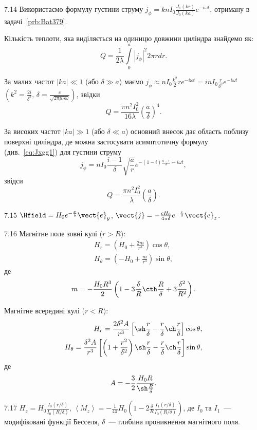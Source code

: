 \begin{Solution}{7.{14}}
	Використаємо формулу густини струму $j_{\phi} = knI_0\frac{J_1(kr)}{J_0(ka)}e^{-i\omega t}$, отриману в задачі~\ref{prb:Bat379}.

	Кількість теплоти, яка виділяється на одиницю довжини циліндра знайдемо як:
	\[
		Q = \frac{1}{2\lambda}\int\limits_0^a |j_{\phi}|^2 2\pi rdr.
	\]

	За малих частот $|ka| \ll 1$ (або $\delta \gg a$) маємо $j_{\phi} \approx nI_0\frac{k^2}{2}re^{-i\omega t} = inI_0\frac{r}{\delta^2}e^{-i\omega t}$ $\left( k^2 = \frac{2i}{\delta^2},\,  \delta = \frac{c}{\sqrt{2\pi\mu\lambda\omega}}\right) $, звідки
	\[
		Q = \frac{\pi n^2 I_0^2}{16\lambda}\left( \frac{a}{\delta}\right)^4.
	\]

	За високих частот $|ka| \gg 1$ (або $\delta \ll a$) основний внесок дає область поблизу поверхні циліндра, де можна застосувати асимптотичну формулу (див.~\eqref{eq:Jxgg1}) для густини струму
	\[
		j_{\phi} = nI_0\frac{i - 1}{\delta}\sqrt{\frac{a}{r}}e^{-(1-i)\frac{a-r}{\delta} - i\omega t},
	\]
	звідси
	\[
		Q = \frac{\pi n^2I_0^2}{\lambda}\left( \frac{a}{\delta}\right).
	\]
\end{Solution}
\begin{Solution}{7.{15}}
	$\Hfield = H_0e^{-\frac{x}{\delta}}\vect{e}_y$,
	$
		\vect{j} = -\frac{cH_0}{4\pi\delta}e^{-\frac{x}{\delta}}\vect{e}_z
	$.
\end{Solution}
\begin{Solution}{7.{16}}
	Магнітне поле зовні кулі ($r > R$):
	\begin{align*}
		H_r = \left( H_0 + \frac{2m}{r^3}\right) \cos\theta, \\
		H_{\theta} = \left( - H_0 + \frac{m}{r^3}\right) \sin\theta,
	\end{align*}
	де
	\[
		m = -\frac{H_0R^3}{2}\left( 1 - 3\frac{\delta}{R}\cth\frac{R}{\delta} + 3\frac{\delta^2}{R^2}\right).
	\]

	Магнітне всередині кулі ($r < R$):
	\begin{align*}
		H_r = \frac{2\delta^2A}{r^3}\left[ \sh\frac{r}{\delta} - \frac{r}{\delta}\ch\frac{r}{\delta}\right]\cos\theta , \\
		H_{\theta} = \frac{\delta^2A}{r^3}\left[ \left( 1+ \frac{r^2}{\delta^2}\right) \sh\frac{r}{\delta} - \frac{r}{\delta}\ch\frac{r}{\delta}\right]\sin\theta,
	\end{align*}
	де
	\[
		A = - \frac32\frac{H_0R}{\sh\frac{R}{\delta} }.
	\]
\end{Solution}
\begin{Solution}{7.{17}}
	$H_z = H_0\frac{I_0(r/\delta)}{I_0(R/\delta)}$,
	$\left\langle M_z\right\rangle  = -\frac{1}{4\pi}H_0\left( 1 - 2\frac{\delta}{R}\frac{I_1(r/\delta)}{I_0(R/\delta)}\right)$,
	де $I_0$ та $I_1$~--- модифіковані функції  Бесселя, $\delta$~--- глибина проникнення магнітного поля.
\end{Solution}
